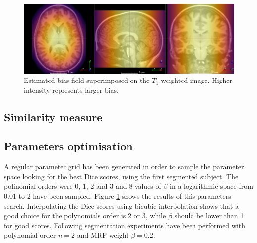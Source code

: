 \begin{figure}
  \centering
  \includegraphics[width=\textwidth]{figures/bias_field}
  \caption{Estimated bias field superimposed on the $T_1$-weighted image. Higher intensity represents larger bias.}
  \label{fig:params-optimisation}
\end{figure}


\subsection{Similarity measure}





\subsection{Parameters optimisation}


A regular parameter grid has been generated in order to sample the parameter space looking for the best Dice scores, using the first segmented subject. The polinomial orders were 0, 1, 2 and 3 and 8 values of $\beta$ in a logarithmic space from 0.01 to 2 have been sampled. Figure \ref{fig:params-optimisation} shows the results of this parameters search. Interpolating the Dice scores using bicubic interpolation shows that a good choice for the polynomials order is 2 or 3, while $\beta$ should be lower than 1 for good scores. Following segmentation experiments have been performed with polynomial order $n = 2$ and MRF weight $\beta = 0.2$.



